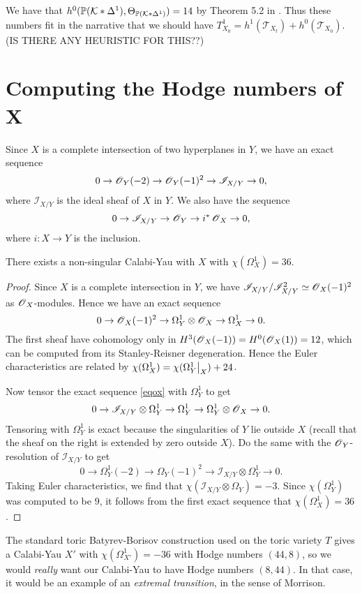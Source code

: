 \documentclass[11pt, english]{article}
\begin{document}
\begin{thm}
We have that $h^0(\mathbb{P}(\mathcal K \ast \Delta^1),\Theta_{\mathbb{P}(\mathcal K \ast \Delta^1)})=14$ by Theorem 5.2 in \cite{deforming_christophersen}. Thus these numbers fit in the narrative that we should have $T^1_{X_0} = h^1(\mathcal T_{X_t}) + h^0(\mathcal T_{X_0})$. (IS THERE ANY HEURISTIC FOR THIS??)

\section{Computing the Hodge numbers of X}

Since $X$ is a complete intersection of two hyperplanes in $Y$, we have an exact sequence
\[
0 \to \operatorname{\mathscr{O}}_Y(-2) \to \operatorname{\mathscr{O}}_Y(-1)^2 \to \mathscr I_{X/Y} \to 0,
\]
where $\mathscr I_{X/Y}$ is the ideal sheaf of $X$ in $Y$. We also have the sequence
\begin{equation}
\label{eqox}
0 \to \mathscr I_{X/Y} \to \operatorname{\mathscr{O}}_Y \to i^\ast \operatorname{\mathscr{O}}_X \to 0,  
\end{equation}
where $i:X \to Y$ is the inclusion.

\begin{thm}
There exists a non-singular Calabi-Yau with $X$ with $\chi(\Omega_X^1)=36$. 
\end{thm}

\begin{proof}
Since $X$ is a complete intersection in $Y$, we have $\mathscr I_{X/Y}/\mathscr I_{X/Y}^2 \simeq \operatorname{\mathscr{O}}_X(-1)^2$ as $\operatorname{\mathscr{O}}_X$-modules. Hence we have an exact sequence
\[
0 \to \operatorname{\mathscr{O}}_X(-1)^2 \to \Omega_Y^1 \otimes \operatorname{\mathscr{O}}_X \to \Omega_X^1 \to 0.
\]
The first sheaf have cohomology only in $H^3(\operatorname{\mathscr{O}}_X(-1))=H^0(\operatorname{\mathscr{O}}_X(1))=12$, which can be computed from its Stanley-Reisner degeneration. Hence the Euler characteristics are related by $\chi(\Omega_X^1) = \chi(\restr{\Omega_Y^1}X) + 24$.

Now tensor the exact sequence \eqref{eqox} with $\Omega_Y^1$ to get
\[
0 \to \mathscr I_{X/Y} \otimes \Omega_Y^1 \to \Omega_Y^1 \to \Omega_Y^1 \otimes \operatorname{\mathscr{O}}_X \to 0.
\]
Tensoring with $\Omega_Y^1$ is exact because the singularities of $Y$ lie outside $X$ (recall that the sheaf on the right is extended by zero outside $X$). Do the same with the $\operatorname{\mathscr{O}}_Y$-resolution of $\mathscr I_{X/Y}$ to get
\[
0 \to \Omega_Y^1(-2) \to \Omega_Y(-1)^2 \to \mathscr I_{X/Y} \otimes \Omega_Y^1 \to 0.
\]
Taking Euler characteristics, we find that $\chi(\mathscr I_{X/Y} \otimes \Omega_Y)=-3$. Since $\chi(\Omega_Y^1)$ was computed to be $9$, it follows from the first exact sequence that $\chi(\Omega_X^1)=36$.
\end{proof}
\begin{remark}
The standard toric Batyrev-Borisov construction used on the toric variety $T$ gives a Calabi-Yau $X'$ with $\chi(\Omega_{X'}^1)=-36$ with Hodge numbers $(44,8)$, so we would \emph{really} want our Calabi-Yau to have Hodge numbers $(8,44)$. In that case, it would be an example of an \emph{extremal transition}, in the sense of Morrison.
\end{remark}


\end{thm}
\end{document}
